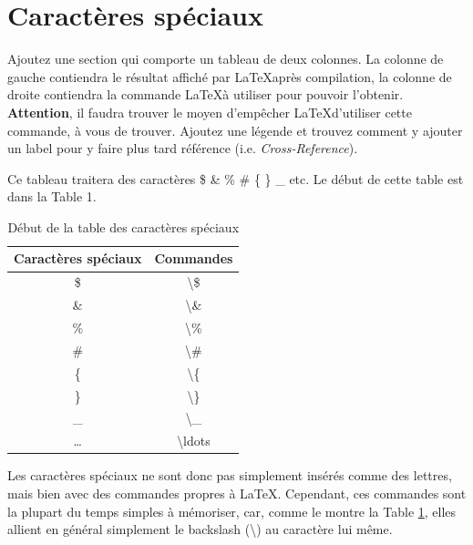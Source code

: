 \documentclass[a4paper, french, 8pt]{report}
\begin{document}
\section{Caractères spéciaux}
\label{section1}
Ajoutez une section qui comporte un tableau de deux colonnes. La colonne de gauche contiendra le résultat affiché par \LaTeX après compilation, la colonne de droite contiendra la commande \LaTeX à utiliser pour pouvoir l'obtenir. \textbf{Attention}, il faudra trouver le moyen d'empêcher \LaTeX d'utiliser cette commande, à vous de trouver. Ajoutez une légende et trouvez comment y ajouter un label pour y faire plus tard référence (i.e. \textit{Cross-Reference}). \medskip

Ce tableau traitera des caractères \$ \& \% \# \{ \} \_ etc. Le début de cette table est dans la Table 1.

    \begin{table}[h]
        \centering
        \begin{tabular}{|c|c|}
             \hline
             Caractères spéciaux & Commandes \\
             \hline
             \hline
             \$ & \textbackslash\$ \\ 
             \hline
             \& & \textbackslash\& \\
             \hline
             \% & \textbackslash\% \\
             \hline
             \# & \textbackslash\# \\
             \hline
             \{ & \textbackslash\{ \\
             \hline
             \} & \textbackslash\} \\
             \hline
             \_ & \textbackslash\_ \\
             \hline
             \ldots & \textbackslash ldots \\
             \hline
        \end{tabular}
        \caption{Début de la table des caractères spéciaux}
        \label{tableau1}
    \end{table}
    
Les caractères spéciaux ne sont donc pas simplement insérés comme des lettres, mais bien avec des commandes propres à \LaTeX . Cependant, ces commandes sont la plupart du temps simples à mémoriser, car, comme le montre la Table \ref{tableau1}, elles allient en général simplement le backslash (\textbackslash) au caractère lui même.

\newpage
\end{document}
